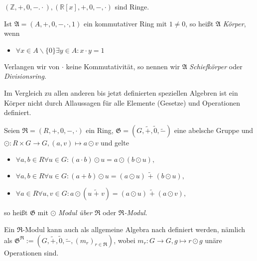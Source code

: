 \begin{example}
    $(\mathbb{Z}, +, 0, -. \cdot), (\mathbb{R}[x], +, 0, -, \cdot)$ sind Ringe.
\end{example}

\begin{samepage}
\begin{definition}
    Ist $\mathfrak{A} = (A,+,0,-,\cdot,1)$ ein kommutativer Ring mit $1\neq 0$, so heißt $\mathfrak{A}$ \emph{Körper}, wenn
    \begin{itemize}
        \item $\forall x \in A\backslash \{0\} \exists y \in A: x\cdot y = 1$
    \end{itemize}
    Verlangen wir von $\cdot$ keine Kommutativität, so nennen wir $\mathfrak{A}$ \emph{Schiefkörper} oder \emph{Divisionsring}.
\end{definition}
\end{samepage}

\begin{remark}
    Im Vergleich zu allen anderen bis jetzt definierten speziellen Algebren ist ein Körper nicht durch Allaussagen für alle Elemente (Gesetze) und Operationen definiert. 
\end{remark}

\begin{definition}
    Seien $\mathfrak{R} = (R, +, 0, -, \cdot)$ ein Ring, $\mathfrak{G} = (G, \widetilde{+}, \widetilde{0}, \widetilde{-})$ eine abelsche Gruppe und $\odot: R \times G \to G, (a, v) \mapsto a \odot v$ und gelte
    \begin{itemize}
        \item $\forall a,b \in R \forall u \in G: (a \cdot b)\odot u = a \odot (b \odot u),$
        \item $\forall a,b \in R \forall u \in G: (a + b) \odot u = (a \odot u) \;\widetilde{+}\; (b \odot u),$
        \item $\forall a \in R \forall u,v \in G: a \odot (u \;\widetilde{+}\; v) = (a \odot u) \;\widetilde{+}\; (a \odot v),$
    \end{itemize}
    so heißt $\mathfrak{G}$ mit $\odot$ \emph{Modul über $\mathfrak{R}$} oder \emph{$\mathfrak{R}$-Modul}.

    Ein $\mathfrak{R}$-Modul kann auch als allgemeine Algebra nach  definiert werden, nämlich als $\mathfrak{G}^\mathfrak{R} := (G, \widetilde{+}, \widetilde{0}, \widetilde{-}, (m_r)_{r \in \mathfrak{R}})$, wobei $m_r: G \to G, g \mapsto r \odot g$ unäre Operationen sind.
\end{definition}

